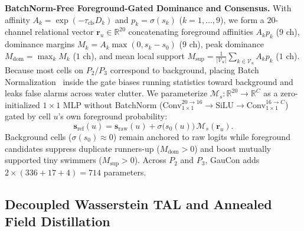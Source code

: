 \documentclass[10pt,twocolumn,letterpaper]{article}
\begin{document}
\textbf{BatchNorm-Free Foreground-Gated Dominance and Consensus.} With affinity $A_k = \exp(-\tau_{\mathrm{cls}} D_k)$ and $p_k = \sigma(s_k)$ ($k=1,\dots,9$), we form a $20$-channel relational vector $\mathbf{r}_u \in \mathbb{R}^{20}$ concatenating foreground affinities $A_k p_k$ ($9$ ch), dominance margins $M_k = A_k \max(0, s_k - s_0)$ ($9$ ch), peak dominance $M_{\mathrm{dom}} = \max_k M_k$ ($1$ ch), and mean local support $M_{\mathrm{sup}} = \frac{1}{|\mathcal{V}_u|}\sum_{k \in \mathcal{V}_u} A_k p_k$ ($1$ ch). Because most cells on $P_2/P_3$ correspond to background, placing Batch Normalization~\cite{ioffe2015batch} inside the gate biases running statistics toward background and leaks false alarms across water clutter. We parameterize $\mathcal{M}_s: \mathbb{R}^{20} \to \mathbb{R}^C$ as a zero-initialized $1\times 1$ MLP without BatchNorm ($\text{Conv}_{1\times 1}^{20\to 16} \to \mathrm{SiLU} \to \text{Conv}_{1\times 1}^{16\to C}$) gated by cell $u$'s own foreground probability:
\begin{equation}
  \mathbf{s}_{\mathrm{ref}}(u) = \mathbf{s}_{\mathrm{raw}}(u) + \sigma\!\big(s_0(u)\big)\,\mathcal{M}_s(\mathbf{r}_u).
  \label{eq:fg_gate}
\end{equation}
Background cells ($\sigma(s_0) \approx 0$) remain anchored to raw logits while foreground candidates suppress duplicate runners-up ($M_{\mathrm{dom}} > 0$) and boost mutually supported tiny swimmers ($M_{\mathrm{sup}} > 0$). Across $P_2$ and $P_3$, GauCon adds $2 \times (336 + 17 + 4) = 714$ parameters.

\subsection{Decoupled Wasserstein TAL and Annealed Field Distillation}
\label{sec:method_dwtal}
\end{document}
